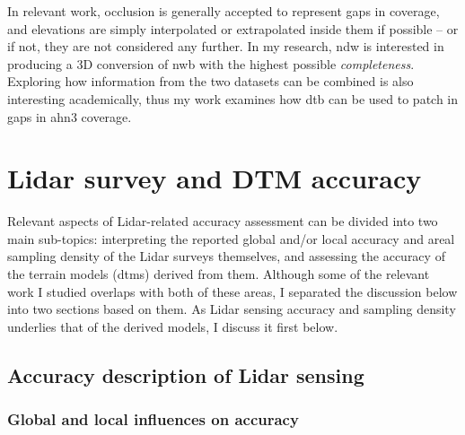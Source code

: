 In relevant work, occlusion is generally accepted to represent gaps in coverage, and elevations are simply interpolated or extrapolated inside them if possible – or if not, they are not considered any further. In my research, \ac{ndw} is interested in producing a 3D conversion of \ac{nwb} with the highest possible \textit{completeness}. Exploring how information from the two datasets can be combined is also interesting academically, thus my work examines how \ac{dtb} can be used to patch in gaps in \ac{ahn3} coverage.

\section{Lidar survey and DTM accuracy}
\label{sec:lidaraccuracy}

Relevant aspects of Lidar-related accuracy assessment can be divided into two main sub-topics: interpreting the reported global and/or local accuracy and areal sampling density of the Lidar surveys themselves, and assessing the accuracy of the terrain models (\ac{dtm}s) derived from them. Although some of the relevant work I studied overlaps with both of these areas, I separated the discussion below into two sections based on them. As Lidar sensing accuracy and sampling density underlies that of the derived models, I discuss it first below.

\subsection{Accuracy description of Lidar sensing}
\label{sub:lidaraccuracy_sensing}

\subsubsection{Global and local influences on accuracy}

